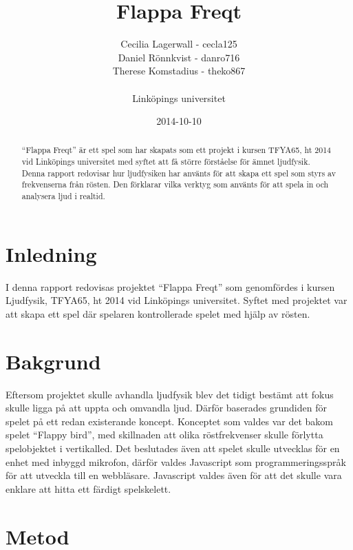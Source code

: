 \documentclass[12pt, titlepage, a4paper]{article}
\begin{document}
  \title{Flappa Freqt}
	\author{Cecilia Lagerwall - cecla125 \\ Daniel Rönnkvist - danro716 \\
			Therese Komstadius - theko867 \\ \\ Linköpings universitet}
	\date{2014-10-10}
	\maketitle

  \renewcommand*\abstractname{Sammanfattning}
  \begin{abstract}
		“Flappa Freqt” är ett spel som har skapats som ett projekt i kursen TFYA65, ht 2014 vid Linköpings universitet med syftet att få större förståelse för ämnet ljudfysik. Denna rapport redovisar hur ljudfysiken har använts för att skapa ett spel som styrs av frekvenserna från rösten. Den förklarar vilka verktyg som använts för att spela in och analysera ljud i realtid.
	\end{abstract}

  \section{Inledning}
		I denna rapport redovisas projektet “Flappa Freqt” som genomfördes i kursen Ljudfysik, TFYA65, ht 2014 vid Linköpings universitet. Syftet med projektet var att skapa ett spel där spelaren kontrollerade spelet med hjälp av rösten.

  \section{Bakgrund}
		Eftersom projektet skulle avhandla ljudfysik blev det tidigt bestämt att fokus skulle ligga på att uppta och omvandla ljud. Därför baserades grundiden för spelet på ett redan existerande koncept. Konceptet som valdes var det bakom spelet “Flappy bird”, med skillnaden att olika röstfrekvenser skulle förlytta spelobjektet i vertikalled. Det beslutades även att spelet skulle utvecklas för en enhet med inbyggd mikrofon, därför valdes Javascript som programmeringsspråk för att utveckla till en webbläsare. Javascript valdes även för att det skulle vara enklare att hitta ett färdigt spelskelett.

	\section{Metod}
\end{document}
